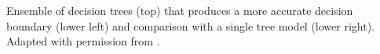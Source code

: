 Ensemble of decision trees (top) that produces a more accurate decision boundary (lower left) and comparison with a single tree model (lower right). Adapted with permission from \cite{Geurts_2009}.